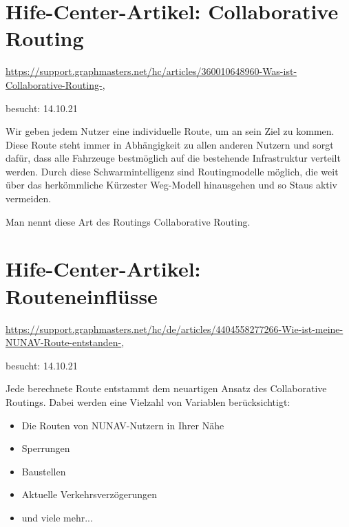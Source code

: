 


\section*{Hife-Center-Artikel: Collaborative Routing}
\label{sec:help_center_collaboratrive_routing}

\url{https://support.graphmasters.net/hc/articles/360010648960-Was-ist-Collaborative-Routing-},

\noindent besucht: 14.10.21

\smallskip

Wir geben jedem Nutzer eine individuelle Route, um an sein Ziel zu kommen. Diese Route steht immer in Abhängigkeit zu allen anderen Nutzern und sorgt dafür, dass alle Fahrzeuge bestmöglich auf die bestehende Infrastruktur verteilt werden. Durch diese Schwarmintelligenz sind Routingmodelle möglich, die weit über das herkömmliche \glqq Kürzester Weg\grqq{}-Modell hinausgehen und so Staus aktiv vermeiden. 

\smallskip

\noindent Man nennt diese Art des Routings \glqq Collaborative Routing\grqq{}. 

\section*{Hife-Center-Artikel: Routeneinflüsse}
\label{sec:help_center_routing_data}

\url{https://support.graphmasters.net/hc/de/articles/4404558277266-Wie-ist-meine-NUNAV-Route-entstanden-},

\noindent besucht: 14.10.21

\smallskip

\noindent Jede berechnete Route entstammt dem neuartigen Ansatz des Collaborative Routings. Dabei werden eine Vielzahl von Variablen berücksichtigt:

\begin{itemize}
    \item Die Routen von NUNAV-Nutzern in Ihrer Nähe
    \item Sperrungen
    \item Baustellen
    \item Aktuelle Verkehrsverzögerungen
    \item und viele mehr...
\end{itemize}

